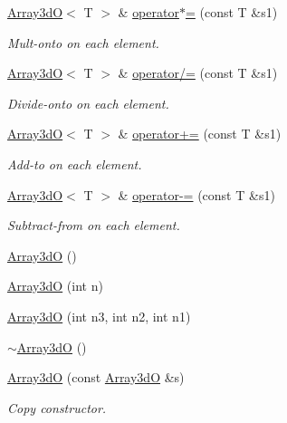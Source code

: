 \begin{DoxyCompactItemize}
\mbox{\hyperlink{classADAT_1_1Array3dO}{Array3dO}}$<$ T $>$ \& \mbox{\hyperlink{classADAT_1_1Array3dO_acec17a674874030d454e516aad24f8a8}{operator$\ast$=}} (const T \&s1)
\begin{DoxyCompactList}\small\item\em Mult-\/onto on each element. \end{DoxyCompactList}\item 
\mbox{\hyperlink{classADAT_1_1Array3dO}{Array3dO}}$<$ T $>$ \& \mbox{\hyperlink{classADAT_1_1Array3dO_a9d82ba391c67603f43b112c945532de6}{operator/=}} (const T \&s1)
\begin{DoxyCompactList}\small\item\em Divide-\/onto on each element. \end{DoxyCompactList}\item 
\mbox{\hyperlink{classADAT_1_1Array3dO}{Array3dO}}$<$ T $>$ \& \mbox{\hyperlink{classADAT_1_1Array3dO_a6e5f624a1a14555b030d5fb53cb85f9c}{operator+=}} (const T \&s1)
\begin{DoxyCompactList}\small\item\em Add-\/to on each element. \end{DoxyCompactList}\item 
\mbox{\hyperlink{classADAT_1_1Array3dO}{Array3dO}}$<$ T $>$ \& \mbox{\hyperlink{classADAT_1_1Array3dO_a0341b7ddc224910074b55646bca45e2a}{operator-\/=}} (const T \&s1)
\begin{DoxyCompactList}\small\item\em Subtract-\/from on each element. \end{DoxyCompactList}\item 
\mbox{\hyperlink{classADAT_1_1Array3dO_aaf7d69b08f7c9e5c01a123da7f52b8d1}{Array3dO}} ()
\item 
\mbox{\hyperlink{classADAT_1_1Array3dO_a4546b7e563774cfcdbe0be19cabbb854}{Array3dO}} (int n)
\item 
\mbox{\hyperlink{classADAT_1_1Array3dO_aed93788a8b6356d91260f6a5afa80f9b}{Array3dO}} (int n3, int n2, int n1)
\item 
\mbox{\hyperlink{classADAT_1_1Array3dO_a71c38217f7d5663f7a067733b9040274}{$\sim$\+Array3dO}} ()
\item 
\mbox{\hyperlink{classADAT_1_1Array3dO_aca48914514856bcde242c27bce944040}{Array3dO}} (const \mbox{\hyperlink{classADAT_1_1Array3dO}{Array3dO}} \&s)
\begin{DoxyCompactList}\small\item\em Copy constructor. \end{DoxyCompactList}\item 

\end{DoxyCompactItemize}
